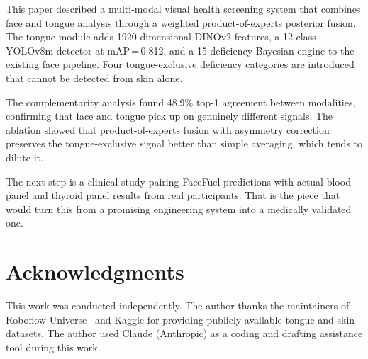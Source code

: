 \documentclass[journal]{IEEEtran}
\begin{document}
This paper described a multi-modal visual health screening system that combines
face and tongue analysis through a weighted product-of-experts posterior fusion.
The tongue module adds 1920-dimensional DINOv2 features, a 12-class YOLOv8m
detector at mAP\,=\,0.812, and a 15-deficiency Bayesian engine to the existing
face pipeline. Four tongue-exclusive deficiency categories are introduced that
cannot be detected from skin alone.

The complementarity analysis found 48.9\% top-1 agreement
between modalities, confirming that face and tongue pick up on genuinely different
signals. The ablation showed that product-of-experts fusion with asymmetry
correction preserves the tongue-exclusive signal better than simple averaging,
which tends to dilute it.

The next step is a clinical study pairing FaceFuel predictions with actual blood
panel and thyroid panel results from real participants. That is the piece that
would turn this from a promising engineering system into a medically validated one.

\section*{Acknowledgments}

This work was conducted independently. The author thanks the maintainers of
Roboflow Universe~\cite{roboflow2023} and Kaggle for providing publicly available
tongue and skin datasets. The author used Claude (Anthropic) as a coding and
drafting assistance tool during this work.



\end{document}
